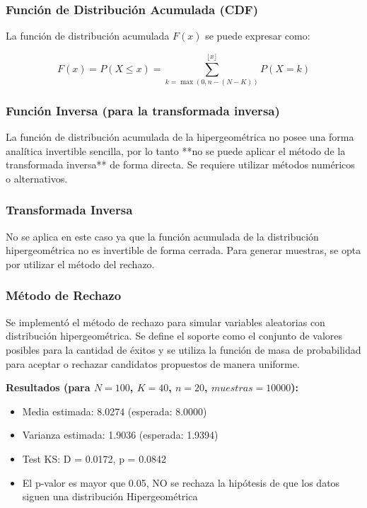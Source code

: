 \documentclass{article}
\begin{document}
\subsubsection*{Función de Distribución Acumulada (CDF)}
La función de distribución acumulada $F(x)$ se puede expresar como:

\[
F(x) = P(X \leq x) = \sum_{k = \max(0, n - (N-K))}^{\lfloor x \rfloor} P(X = k)
\]

\subsubsection*{Función Inversa (para la transformada inversa)}
La función de distribución acumulada de la hipergeométrica no posee una forma analítica invertible sencilla, por lo tanto **no se puede aplicar el método de la transformada inversa** de forma directa. Se requiere utilizar métodos numéricos o alternativos.

\subsubsection{Transformada Inversa}
No se aplica en este caso ya que la función acumulada de la distribución hipergeométrica no es invertible de forma cerrada. Para generar muestras, se opta por utilizar el método del rechazo.

\vspace{0.5em}
\subsubsection{Método de Rechazo}
Se implementó el método de rechazo para simular variables aleatorias con distribución hipergeométrica. Se define el soporte como el conjunto de valores posibles para la cantidad de éxitos y se utiliza la función de masa de probabilidad para aceptar o rechazar candidatos propuestos de manera uniforme.


\textbf{Resultados (para $N=100$, $K=40$, $n=20$, $muestras=10000$):}
\begin{itemize}
  \item Media estimada: 8.0274 (esperada: 8.0000)
  \item Varianza estimada: 1.9036 (esperada: 1.9394)
  \item Test KS: D = 0.0172, p = 0.0842
  \item El p-valor es mayor que 0.05, NO se rechaza la hipótesis de que los datos siguen una distribución Hipergeométrica
\end{itemize}
\end{document}
